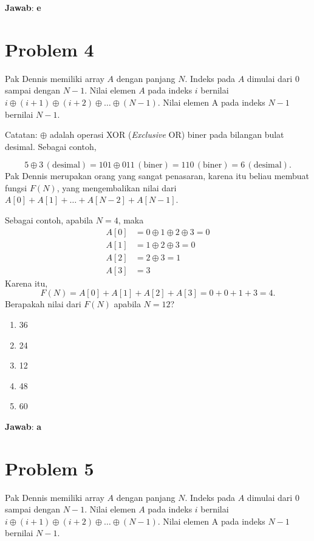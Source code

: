 \documentclass{article}
\theoremstyle{plain}
\begin{document}
\bigskip
\noindent \textbf{Jawab}: \textbf{e}

\newpage
\section*{Problem 4}
Pak Dennis memiliki array $A$ dengan panjang $N$. Indeks pada $A$ dimulai dari $0$ sampai dengan $N-1$. Nilai elemen $A$ pada indeks $i$ bernilai $i \oplus (i + 1) \oplus (i + 2) \oplus \ldots \oplus (N-1)$. Nilai elemen A pada indeks $N-1$ bernilai $N-1$.

\bigskip
\noindent Catatan: $\oplus$ adalah operasi XOR (\textit{Exclusive} OR) biner pada bilangan bulat desimal. Sebagai contoh,

\begin{equation*}
5 \oplus 3 \, (\text{desimal}) = 101 \oplus 011 \, (\text{biner}) = 110 \, (\text{biner}) = 6 \, (\text{desimal}). 
\end{equation*}
Pak Dennis merupakan orang yang sangat penasaran, karena itu beliau membuat fungsi $F(N)$, yang mengembalikan nilai dari $A[0] + A[1] + \ldots + A[N - 2] + A[N - 1]$. 

\bigskip
\noindent Sebagai contoh, apabila $N=4$, maka
\begin{align*}
A[0] &= 0 \oplus 1 \oplus 2 \oplus 3 = 0 \\
A[1] &= 1 \oplus 2 \oplus 3 = 0 \\
A[2] &= 2 \oplus 3 = 1 \\
A[3] &= 3 
\end{align*}
Karena itu,
\begin{equation*}
	F(N) = A[0] + A[1] + A[2] + A[3] = 0 + 0 + 1 + 3 = 4.
\end{equation*}
Berapakah nilai dari $F(N)$ apabila $N=12$?

	\begin{enumerate}[-,topsep=0pt, nosep,label=\alph*. ]
		\item 36
		\item 24
		\item 12
		\item 48
		\item 60
	\end{enumerate}

\bigskip
\noindent \textbf{Jawab}: \textbf{a}

\newpage
\section*{Problem 5}
Pak Dennis memiliki array $A$ dengan panjang $N$. Indeks pada $A$ dimulai dari $0$ sampai dengan $N-1$. Nilai elemen $A$ pada indeks $i$ bernilai $i \oplus (i + 1) \oplus (i + 2) \oplus \ldots \oplus (N-1)$. Nilai elemen A pada indeks $N-1$ bernilai $N-1$.
\end{document}
